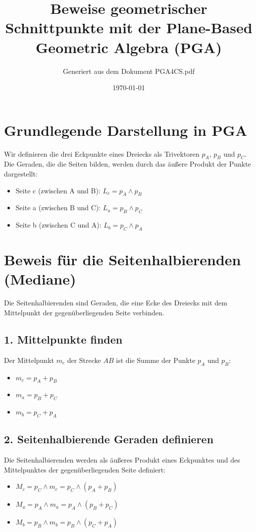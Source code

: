 \documentclass{article}
\title{Beweise geometrischer Schnittpunkte mit der Plane-Based Geometric Algebra (PGA)}
\author{Generiert aus dem Dokument PGA4CS.pdf}
\date{\today}
\begin{document}
\maketitle

\section{Grundlegende Darstellung in PGA}

Wir definieren die drei Eckpunkte eines Dreiecks als Trivektoren $p_A$, $p_B$ und $p_C$. Die Geraden, die die Seiten bilden, werden durch das äußere Produkt der Punkte dargestellt:
\begin{itemize}
    \item Seite c (zwischen A und B): $L_c = p_A \wedge p_B$
    \item Seite a (zwischen B und C): $L_a = p_B \wedge p_C$
    \item Seite b (zwischen C und A): $L_b = p_C \wedge p_A$
\end{itemize}

\section{Beweis für die Seitenhalbierenden (Mediane)}

Die Seitenhalbierenden sind Geraden, die eine Ecke des Dreiecks mit dem Mittelpunkt der gegenüberliegenden Seite verbinden.

\subsection*{1. Mittelpunkte finden}
Der Mittelpunkt $m_c$ der Strecke $AB$ ist die Summe der Punkte $p_A$ und $p_B$:
\begin{itemize}
    \item $m_c = p_A + p_B$
    \item $m_a = p_B + p_C$
    \item $m_b = p_C + p_A$
\end{itemize}

\subsection*{2. Seitenhalbierende Geraden definieren}
Die Seitenhalbierenden werden als äußeres Produkt eines Eckpunktes und des Mittelpunktes der gegenüberliegenden Seite definiert:
\begin{itemize}
    \item $M_c = p_C \wedge m_c = p_C \wedge (p_A + p_B)$
    \item $M_a = p_A \wedge m_a = p_A \wedge (p_B + p_C)$
    \item $M_b = p_B \wedge m_b = p_B \wedge (p_C + p_A)$
\end{itemize}
\end{document}
